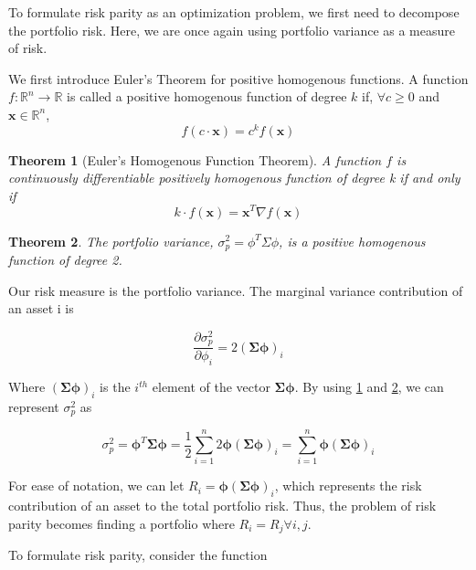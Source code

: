 \documentclass[12pt]{article}
\newtheorem{theorem}{Theorem}
\begin{document}
To formulate risk parity as an optimization problem, we first need to decompose the portfolio risk. Here, we are once again using portfolio variance as a measure of risk. 

We first introduce Euler's Theorem for positive homogenous functions. A function $f: \mathbb{R}^n \rightarrow \mathbb{R}$ is called a positive homogenous function of degree $k$ if, $\forall c \geq 0$ and $\boldsymbol{x} \in \mathbb{R}^n$,
\begin{equation}
f(c \cdot \boldsymbol{x}) = c^k f(\boldsymbol{x})
\end{equation}

\begin{theorem}[Euler's Homogenous Function Theorem]
\label{euler-homogenous-function}
A function $f$ is continuously differentiable positively homogenous function of degree k if and only if
\[k \cdot f(\boldsymbol{x}) = \boldsymbol{x}^T \nabla f(\boldsymbol{x})\]
\end{theorem}

\begin{theorem}
\label{var-degree-2}
The portfolio variance, $\sigma_p^2 = {\phi^T \Sigma \phi}$, is a positive homogenous function of degree 2.
\end{theorem}

Our risk measure is the portfolio variance.  The marginal variance contribution of an asset i is 

\[
	\frac{\partial \sigma_p^2}{\partial \phi_i} = 2(\boldsymbol{\Sigma} \boldsymbol{\boldsymbol{\phi}})_i
\]

Where $(\boldsymbol{\Sigma} \boldsymbol{\boldsymbol{\phi}})_i$ is the $i^{th}$ element of the vector $\boldsymbol{\Sigma} \boldsymbol{\phi}$. By using \ref{euler-homogenous-function} and \ref{var-degree-2}, we can represent $\sigma_p^2$ as

\[
\sigma_p^2 = \boldsymbol{\phi}^T \boldsymbol{\Sigma} \boldsymbol{\phi} = \frac{1}{2}\sum_{i=1}^n 2\boldsymbol{\phi}(\boldsymbol{\Sigma} \boldsymbol{\boldsymbol{\phi}})_i = \sum_{i=1}^n \boldsymbol{\phi}(\boldsymbol{\Sigma} \boldsymbol{\boldsymbol{\phi}})_i 
\]

For ease of notation, we can let $R_i =  \boldsymbol{\phi}(\boldsymbol{\Sigma} \boldsymbol{\boldsymbol{\phi}})_i $, which represents the risk contribution of an asset to the total portfolio risk. Thus, the problem of risk parity becomes finding a portfolio where $R_i = R_j \forall i, j$.

To formulate risk parity, consider the function
\end{document}
